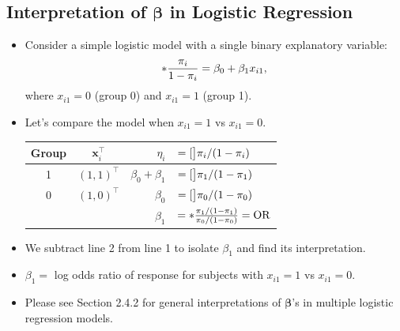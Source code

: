 \documentclass[oneside]{book}\usepackage[]{graphicx}\usepackage[svgnames]{xcolor}
\let\log\relax%
\newcommand{\OR}{\text{OR}}%
\providecommand{\Vector}[1]{\bm{#1}}%
\begin{document}
\subsection*{Interpretation of $ \Vector{\beta} $ in Logistic Regression}
\begin{itemize}
      \item Consider a simple logistic model with a single binary explanatory variable:
            \[ \log*{\frac{\pi_i}{1-\pi_i}}=\beta_0+\beta_1x_{i1}, \]
            where $ x_{i1}=0 $ (group 0) and $ x_{i1}=1 $ (group 1).
      \item Let's compare the model when $ x_{i1}=1 $ vs $ x_{i1}=0 $.
            \begin{table}[!htbp]
                  \centering
                  \begin{tabular}{ccrl}
                        Group & $ \Vector{x}_i^\top $ & $ \eta_i $          & $ =\log[\big]{\pi_i/(1-\pi_i)} $                              \\
                        \midrule
                        1     & $ (1,1)^\top $        & $ \beta_0+\beta_1 $ & $ =\log[\big]{\pi_1/(1-\pi_1)} $                              \\
                        0     & $ (1,0)^\top $        & $ \beta_0 $         & $ =\log[\big]{\pi_0/(1-\pi_0)} $                              \\
                        \midrule
                              &                       & $ \beta_1 $         & $ =\log*{\frac{\pi_1/(1-\pi_1)}{\pi_0/(1-\pi_0)}}=\log{\OR} $
                  \end{tabular}
            \end{table}
      \item We subtract line 2 from line 1 to isolate $ \beta_1 $ and find its interpretation.
      \item $ \beta_1= $ log odds ratio of response for subjects with $ x_{i1}=1 $ vs $ x_{i1}=0 $.
      \item Please see Section 2.4.2 for general interpretations of $ \Vector{\beta} $'s in multiple logistic regression models.
\end{itemize}
\end{document}
